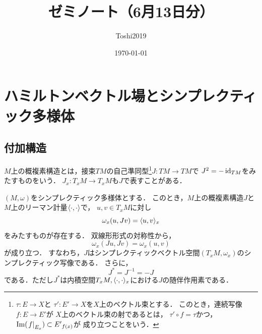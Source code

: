 \newcommand{\cotn}[1][]{\dot{T}^{\ast}{#1}}


\newcommand{\muhom}{\mu hom}
\newcommand{\muHom}[1][]{\mathrm{Hom}^\mu_{\raise1.5ex\hbox to.1em{}#1}}

\newcommand{\mucat}[2][]{\mathsf{D}^{\mathrm{b}}_{#1}(#2)}

\newcommand{\conv}[1][]{\mathbin{\mathop{\circ}\limits_{#1}}}

\newcommand{\torus}{\mathbf{T}}



\title{ゼミノート（6月13日分）}
\author{Toshi2019}
\date{\today}

\maketitle
\tableofcontents
\section{ハミルトンベクトル場とシンプレクティック多様体}
\subsection*{付加構造}
\(M\)上の概複素構造とは，接束\(TM\)の自己準同型\footnote{
    \(\tau\colon E\to X\)と
    \(\tau'\colon E'\to X\)を\(X\)上のベクトル束とする．
    このとき，連続写像\(f\colon E\to E'\)が
    \(X\)上のベクトル束の射であるとは，
    \(\tau'\circ f=\tau\)かつ，
    \(\im(\mres[f]{{E}_{x}})\subset {E'}_{f(x)}\)が
    成り立つことをいう．
}\(J\colon TM\to TM\)で
\(J^2=-\id_{TM}\)をみたすものをいう．
\(J_x\colon T_{x}M\to T_{x}M\)も\(J\)で表すことがある．

\begin{PRP}
    \((M,\omega)\)をシンプレクティック多様体とする．
    このとき，\(M\)上の概複素構造\(J\)と
    \(M\)上のリーマン計量\(\inner<\cdot,\cdot>\)で，
    \(u,v\in T_{x}M\)に対し\begin{equation}
        \omega_{x}(u,Jv)=\inner<u,v>_{x}\label{eq:1.34}
    \end{equation}
    をみたすものが存在する．
    双線形形式の対称性から，
    \begin{equation}
        \omega_{x}(Ju,Jv)=\omega_{x}(u,v)\label{eq:1.35}
    \end{equation}
    が成り立つ．
    すなわち，\(J\)はシンプレクティックベクトル空間\(
        (T_{x}M,\omega_x)
    \)のシンプレクティック写像である．
    さらに，
    \begin{equation}
        J^{\ast}=J^{-1}=-J\label{eq:1.36}
    \end{equation}
    である．ただし\(J^{\ast}\)は内積空間\(
        T_{x}M,\inner<\cdot,\cdot>_{x}
    \)における\(J\)の随伴作用素である．
\end{PRP}

